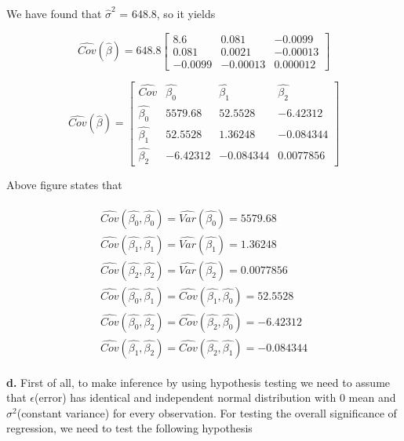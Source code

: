 \documentclass{article}
\begin{document}
We have found that $\hat{\sigma}^2$ = 648.8, so it yields

\begin{equation}
    \hat{Cov}(\hat{\beta}) = 648.8
    \begin{bmatrix} 
    8.6 & 0.081 & -0.0099 \\
    0.081 & 0.0021 & -0.00013 \\
    -0.0099 & -0.00013 & 0.000012
    \end{bmatrix} 
\end{equation}

\begin{equation}
    \hat{Cov}(\hat{\beta}) =
    \begin{bmatrix}
    \hat{Cov} & \hat{\beta_0} & \hat{\beta_1} & \hat{\beta_2} \\
    \hat{\beta_0} & 5579.68 & 52.5528  &-6.42312 \\ \hat{\beta_1} &52.5528 & 1.36248 & -0.084344 \\ 
    \hat{\beta_2} &-6.42312 & -0.084344 & 0.0077856
    \end{bmatrix} 
\end{equation}

Above figure states that 


\begin{align}
\begin{split}
\hat{Cov}(\hat{\beta_0},\hat{\beta_0}) = \hat{Var}(\hat{\beta_0}) = 5579.68
\\
\hat{Cov}(\hat{\beta_1},\hat{\beta_1}) =
\hat{Var}(\hat{\beta_1}) =   1.36248
\\
\hat{Cov}(\hat{\beta_2},\hat{\beta_2}) =
\hat{Var}(\hat{\beta_2}) = 0.0077856
\\
\hat{Cov}(\hat{\beta_0},\hat{\beta_1}) = \hat{Cov}(\hat{\beta_1},\hat{\beta_0}) = 52.5528
\\
\hat{Cov}(\hat{\beta_0},\hat{\beta_2}) =
\hat{Cov}(\hat{\beta_2},\hat{\beta_0}) =  -{6.42312}
\\
\hat{Cov}(\hat{\beta_1},\hat{\beta_2}) =
\hat{Cov}(\hat{\beta_2},\hat{\beta_1}) = 
-{0.084344}
\end{split}
\end{align}

\newpage
\textbf{d.} First of all, to make inference by using hypothesis testing we need to assume that $\epsilon$(error) has identical and independent normal distribution with 0 mean and $\sigma^2$(constant variance) for every observation. For testing the overall significance of regression, we need to test the following hypothesis
\end{document}
